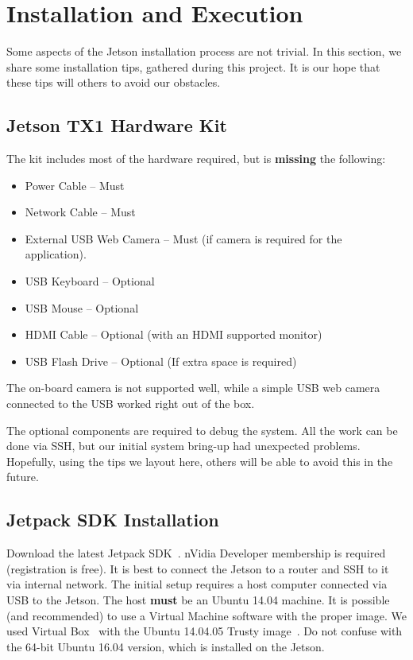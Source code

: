 \section{Installation and Execution}
\label{sec:installation}
Some aspects of the Jetson installation process are not trivial. In this section, we share some installation tips, gathered during this project. It is our hope that these tips will others to avoid our obstacles.

\subsection{Jetson TX1 Hardware Kit}
The kit includes most of the hardware required, but is \textbf{missing} the following:
\begin{itemize}
\item Power Cable -- Must
\item Network Cable -- Must
\item External USB Web Camera -- Must (if camera is required for the application). \item USB Keyboard -- Optional
\item USB Mouse -- Optional
\item HDMI Cable -- Optional (with an HDMI supported monitor)
\item USB Flash Drive -- Optional (If extra space is required)
\end{itemize}

The on-board camera is not supported well, while a simple USB web camera connected to the USB worked right out of the box.

The optional components are required to debug the system. All the work can be done via SSH, but our initial system bring-up had unexpected problems. Hopefully, using the tips we layout here, others will be able to avoid this in the future.

\subsection{Jetpack SDK Installation}
Download the latest Jetpack SDK~\cite{jetpackinstall}. nVidia Developer membership is required (registration is free).
It is best to connect the Jetson to a router and SSH to it via internal network. The initial setup requires a host computer connected via USB to the Jetson. The host \textbf{must} be an Ubuntu 14.04 machine. It is possible (and recommended) to use a Virtual Machine software with the proper image. We used Virtual Box~\cite{virtualboxinstall} with the Ubuntu 14.04.05 Trusty image~\cite{virtualboxubuntuimage}. Do not confuse with the 64-bit Ubuntu 16.04 version, which is installed on the Jetson.

